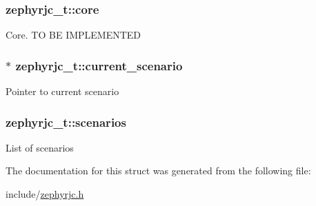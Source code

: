 \subsubsection[{\texorpdfstring{core}{core}}]{ zephyrjc\+\_\+t\+::core}\hypertarget{structzephyrjc__t_a800442229142f5481edfa1ef68828ed8}{}\label{structzephyrjc__t_a800442229142f5481edfa1ef68828ed8}
Core. TO BE I\+M\+P\+L\+E\+M\+E\+N\+T\+ED 
\subsubsection[{\texorpdfstring{current\+\_\+scenario}{current\_scenario}}]{$\ast$ zephyrjc\+\_\+t\+::current\+\_\+scenario}\hypertarget{structzephyrjc__t_a72c00754a438f734de92e2dfc26af6fd}{}\label{structzephyrjc__t_a72c00754a438f734de92e2dfc26af6fd}
Pointer to current scenario 
\subsubsection[{\texorpdfstring{scenarios}{scenarios}}]{ zephyrjc\+\_\+t\+::scenarios}\hypertarget{structzephyrjc__t_a1a1b1b67ffc0bb743303ebebe105e7ad}{}\label{structzephyrjc__t_a1a1b1b67ffc0bb743303ebebe105e7ad}
List of scenarios 

The documentation for this struct was generated from the following file\+:\begin{DoxyCompactItemize}
\item 
include/\hyperlink{zephyrjc_8h}{zephyrjc.\+h}\end{DoxyCompactItemize}
